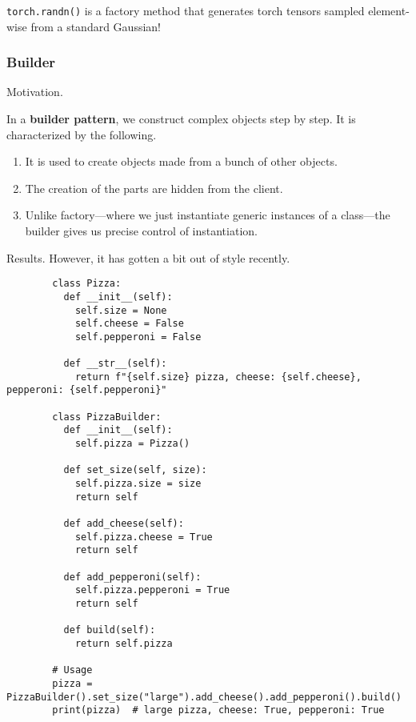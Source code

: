     \begin{example}
      \texttt{torch.randn()} is a factory method that generates torch tensors sampled element-wise from a standard Gaussian! 
    \end{example}

  \subsubsection{Builder} 

    Motivation. 

    \begin{definition}
      In a \textbf{builder pattern}, we construct complex objects step by step. It is characterized by the following. 
      \begin{enumerate}
        \item It is used to create objects made from a bunch of other objects. 
        \item The creation of the parts are hidden from the client. 
        \item Unlike factory---where we just instantiate generic instances of a class---the builder gives us precise control of instantiation. 
      \end{enumerate}
    \end{definition}

    Results. However, it has gotten a bit out of style recently. 

    \begin{example}[Pizza]
      \begin{lstlisting}
        class Pizza:
          def __init__(self):
            self.size = None
            self.cheese = False
            self.pepperoni = False
          
          def __str__(self):
            return f"{self.size} pizza, cheese: {self.cheese}, pepperoni: {self.pepperoni}"

        class PizzaBuilder:
          def __init__(self):
            self.pizza = Pizza()
          
          def set_size(self, size):
            self.pizza.size = size
            return self
          
          def add_cheese(self):
            self.pizza.cheese = True
            return self
          
          def add_pepperoni(self):
            self.pizza.pepperoni = True
            return self
          
          def build(self):
            return self.pizza

        # Usage
        pizza = PizzaBuilder().set_size("large").add_cheese().add_pepperoni().build()
        print(pizza)  # large pizza, cheese: True, pepperoni: True 
      \end{lstlisting}
    \end{example}

